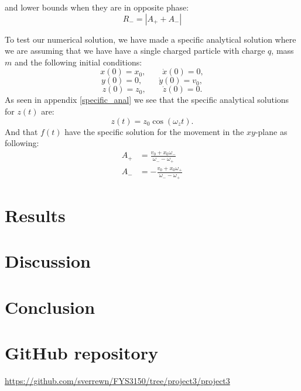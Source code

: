 \documentclass[english,notitlepage,reprint,nofootinbib]{revtex4-1}  %
\begin{document}
	and lower bounds when they are in opposite phase:
	\begin{equation*}
		R_- = | A_+ + A_- |
	\end{equation*}

	To test our numerical solution, we have made a specific analytical solution where we are assuming that we have have a single charged particle with charge $q$, mass $m$ and the following initial conditions:
	$$ x(0) = x_0, \qquad \dot{x}(0) = 0, $$
	$$ y(0) = 0, \qquad \dot{y}(0) = v_0, $$
	$$ z(0) = z_0, \qquad \dot{z}(0) = 0. $$
	As seen in appendix \ref{specific_anal} we see that the specific analytical solutions for $z(t)$ are:
	\begin{equation}
		z(t) = z_0 \cos (\omega_z t).
	\end{equation}
	And that $f(t)$ have the specific solution for the movement in the $xy$-plane as following:
	\begin{align}
		A_+ &= \frac{v_0 + x_0 \omega_-}{\omega_- - \omega_+}\\
		A_- &= - \frac{v_0 + x_0 \omega_+}{\omega_- - \omega_+}
	\end{align}






	
	
	\section{Results}\label{sec:results}
	
	
	\section{Discussion}\label{sec:discussion}
	
	
	\section{Conclusion}\label{sec:conclusion}

	\appendix
	\section{GitHub repository}
	\url{https://github.com/sverrewn/FYS3150/tree/project3/project3}
\end{document}
